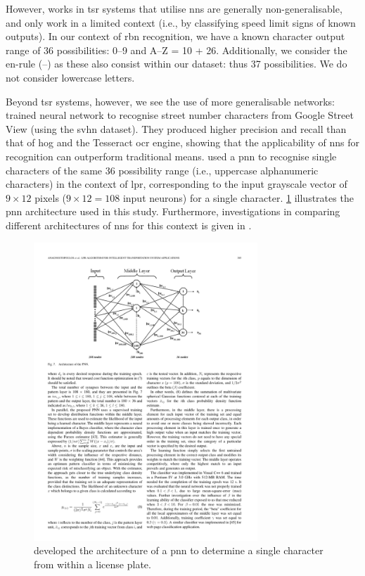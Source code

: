 However, works in \gls{tsr} systems that utilise \glspl{nn} are generally non-generalisable, and only work in a limited context (i.e., by classifying speed limit signs of known outputs). In our context of \gls{rbn} recognition, we have a known character output range of 36 possibilities: 0--9 and A--Z = 10 + 26. Additionally, we consider the en-rule (--) as these also consist within our dataset: thus 37 possibilities. We do not consider lowercase letters.

Beyond \gls{tsr} systems, however, we see the use of more generalisable networks: \citet{Netzer:2011to} trained neural network to recognise street number characters from Google Street View (using the \gls{svhn} dataset). They produced higher precision and recall than that of \gls{hog} and the Tesseract \gls{ocr} engine, showing that the applicability of \glspl{nn} for recognition can outperform traditional means. \citet{Anagnostopoulos:2006wv} used a \gls{pnn} to recognise single characters of the same 36 possibility range (i.e., uppercase alphanumeric characters) in the context of \gls{lpr}, corresponding to the input grayscale vector of $9 \times 12$ pixels ($9 \times 12 = 108$ input neurons) for a single character. \cref{fig:background:recognition:anagnostopoulos2006_nn} illustrates the \gls{pnn} architecture used in this study. Furthermore, investigations in comparing different architectures of \glspl{nn} for this context is given in \citet{Lee:2016uy}.

\begin{figure}[h]
  \centering
  \includegraphics[width=0.75\textwidth]{images/background/anagnostopoulos2006_nn}
  \caption[A PNN used to recognise license plate characters]{\citet{Anagnostopoulos:2006wv} developed the architecture of a \gls{pnn} to determine a single character from within a license plate.}
  \label{fig:background:recognition:anagnostopoulos2006_nn}
\end{figure}


